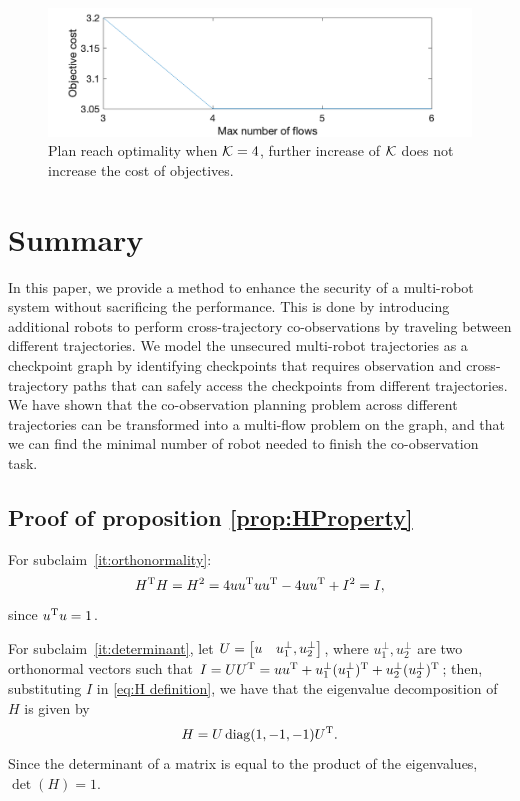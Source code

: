 \documentclass[journal]{IEEEtran}  %
\begin{document}
\begin{figure}[htbp]
\begin{center}
\includegraphics[width=0.6\linewidth]{nflow_vs_cost}
\caption{Plan reach optimality when $\mathcal{K}=4$, further increase of $\mathcal{K}$ does not increase the cost of objectives.}
\label{fig:flow-n-vs-cost}
\end{center}
\end{figure}

\section{Summary}
In this paper, we provide a method to enhance the security of a multi-robot system without sacrificing the performance. This is done by introducing additional robots to perform cross-trajectory co-observations by traveling between different trajectories. We model the unsecured multi-robot trajectories as a checkpoint graph by identifying checkpoints that requires observation and cross-trajectory paths that can safely access the checkpoints from different trajectories. We have shown that the co-observation planning problem across different trajectories can be transformed into a multi-flow problem on the graph, and that we can find the minimal number of robot needed to finish the co-observation task.

\appendix


\subsection{Proof of proposition \ref{prop:HProperty}} \label{proof:HProperty}
    For subclaim~\ref{it:orthonormality}:
    \begin{equation}
      H^\mathrm{T} H=H^2=4uu^\mathrm{T} u u^\mathrm{T} - 4uu^\mathrm{T} +I^2=I,
    \end{equation}
    since $u^\mathrm{T} u=1$.

    For subclaim~\ref{it:determinant}, let $U=\begin{bmatrix}u & u^\bot_{1},u^\bot_{2}\end{bmatrix}$, where $u^\bot_{1},u^\bot_{2}$ are two orthonormal vectors such that $I=UU^\mathrm{T}=uu^\mathrm{T} + u^\bot_{1}(u^\bot_{1})^\mathrm{T}+u^\bot_{2}(u^\bot_{2})^\mathrm{T}$; then, substituting $I$ in \eqref{eq:H definition}, we have that the eigenvalue decomposition of $H$ is given by
    \begin{equation}
      H=U\operatorname{diag}(1,-1,-1) U^\mathrm{T}.
    \end{equation}
    Since the determinant of a matrix is equal to the product of the eigenvalues, $\det(H)=1$.
\end{document}
